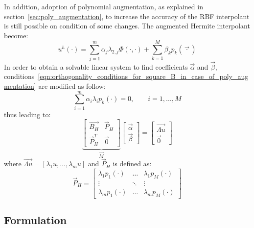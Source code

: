 \smallskip
In addition, adoption of polynomial augmentation, as explained in section~\vref{sec:poly_augmentation}, to increase the accuracy of the RBF interpolant is still possible on condition of some changes. The augmented Hermite interpolant become:
\begin{equation}
	\label{eqn:Hermite_interpolant_plus_polynomial_augmentation}
	u^h(\cdot) = \sum_{j=1}^{m} \alpha_j \lambda_{2,j} \Phi(\cdot,\cdot) + \sum_{k=1}^{M} \beta_k p_k(\vec{\cdot})
\end{equation}
In order to obtain a solvable linear system to find coefficients $\vec{\alpha}$ and $\vec{\beta}$, conditions~\eqref{eqn:orthogonality_conditions_for_square_B_in_case_of_poly_augmentation} are modified as follow:
\begin{equation}
	\label{eqn:orthogonality_conditions_HRBF}
	\sum_{i=1}^{m} \alpha_i \lambda_i p_k(\cdot) = 0, \qquad i=1, \dots, M
\end{equation}
thus leading to:
\begin{equation}
\underbrace{
\begin{bmatrix}
	\vec{B_H}  	 &  \vec{P}_H  \\
	\vec{P}_H^T  &  \vec{0}
\end{bmatrix}}_{\vec{M}}
\begin{bmatrix}
	\vec{\alpha}  \\
	\vec{\beta}
\end{bmatrix} = 
\begin{bmatrix}
	\vec{\Lambda u}  \\
	\vec{0}
\end{bmatrix}
\end{equation}
where $\vec{\Lambda u} = [\lambda_1 u, \dots, \lambda_m u]$ and $\vec{P}_H$ is defined as:
\begin{equation}
\vec{P}_H = 
\begin{bmatrix}
	\lambda_1 p_1(\cdot)  &  \dots  & \lambda_1 p_M(\cdot)  \\
	\vdots				  & \ddots  & \vdots				\\
	\lambda_m p_1(\cdot)  &  \dots  & \lambda_m p_M(\cdot)
\end{bmatrix}
\end{equation}


\subsection{Formulation}

